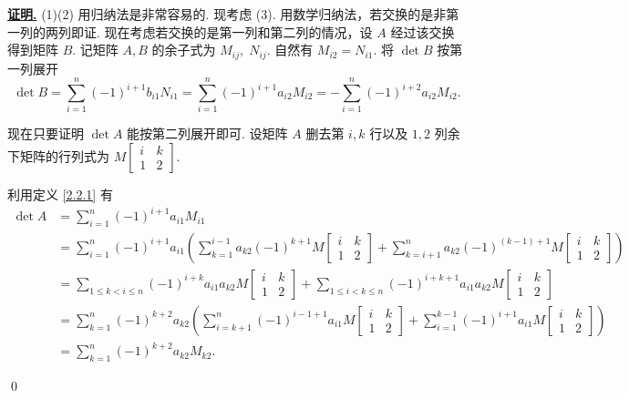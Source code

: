 \documentclass[10pt,openany]{article}
\theoremstyle{thmstyle} %
\theoremstyle{defstyle} %
\theoremstyle{prostyle} %
\theoremstyle{exastyle}
\theoremstyle{remstyle}
\renewenvironment{proof}[1][证明]{\par\underline{\textbf{#1.}} \;\fangsong}{\qed\par}
\begin{document}
\begin{proof}
     (1)(2) 用归纳法是非常容易的. 现考虑 (3). 用数学归纳法，若交换的是非第一列的两列即证. 现在考虑若交换的是第一列和第二列的情况，设 \( A \) 经过该交换得到矩阵 \( B \). 记矩阵 \( A,B \) 的余子式为 \( M_{ij}, \; N_{ij} \). 自然有 \( M_{i2}=N_{i1} \). 将 \( \det B \) 按第一列展开
     \[ \det B= \sum_{i=1}^{n} (-1)^{i+1} b_{i1}N_{i1}= \sum_{i=1}^{n} (-1)^{i+1} a_{i2}M_{i2}= -\sum_{i=1}^{n} (-1)^{i+2} a_{i2}M_{i2}. \]
     
     现在只要证明 \( \det A \) 能按第二列展开即可. 设矩阵 \( A \) 删去第 \( i,k \) 行以及 \( 1,2 \) 列余下矩阵的行列式为 \( M\begin{bmatrix}
     i & k \\ 1 & 2
     \end{bmatrix} \).
     
     利用定义 \ref{2.2.1} 有
     \begin{align*}
     	\det A & = \sum_{i=1}^{n} (-1)^{i+1}a_{i1}M_{i1} \\
     	&= \sum_{i=1}^{n} (-1)^{i+1}a_{i1} \left(\sum_{k=1}^{i-1}a_{k2}(-1)^{k+1}M\begin{bmatrix}
     		i & k \\ 1 & 2
     	\end{bmatrix}+\sum_{k=i+1}^{n}a_{k2}(-1)^{(k-1)+1}M\begin{bmatrix}
     	i & k \\ 1 & 2
     	\end{bmatrix} \right) \\
     	&= \sum_{1 \leq k<i \leq n}^{} (-1)^{i+k} a_{i1}a_{k2} M\begin{bmatrix}
     		i & k \\ 1 & 2
     	\end{bmatrix}+ \sum_{1 \leq i<k \leq n}^{}  (-1)^{i+k+1} a_{i1}a_{k2} M\begin{bmatrix}
     	i & k \\ 1 & 2
     	\end{bmatrix} \\
     	&= \sum_{k=1}^{n} (-1)^{k+2}a_{k2} \left( \sum_{i=k+1}^{n} (-1)^{i-1+1}a_{i1}M\begin{bmatrix}
     		i & k \\ 1 & 2
     	\end{bmatrix}+ \sum_{i=1}^{k-1}(-1)^{i+1}a_{i1}M\begin{bmatrix}
     	i & k \\ 1 & 2
     	\end{bmatrix} \right) \\
     	&= \sum_{k=1}^{n} (-1)^{k+2}a_{k2}M_{k2}.
     \end{align*}
     

\end{proof}
\end{document}
